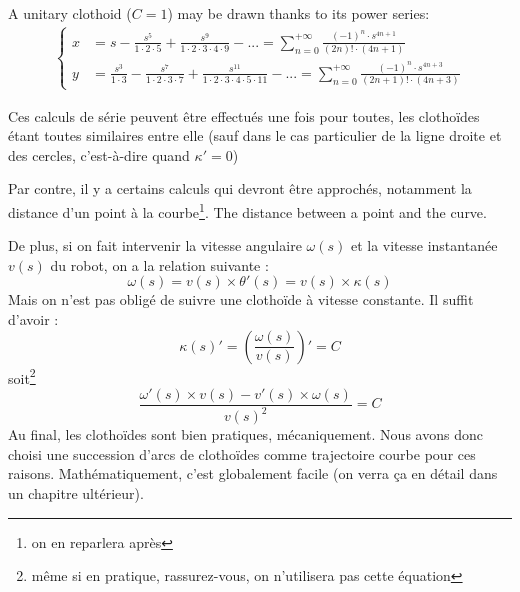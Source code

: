 \documentclass[11pt]{article}
\begin{document}
    A unitary clothoid ($C = 1$) may be drawn thanks to its power series:
    \begin{align*}
        \tag{**}
        \begin{cases}
            x &= s - \frac{s^5}{1 \cdot 2 \cdot 5} + \frac{s^9}{1 \cdot 2 \cdot 3 \cdot 4 \cdot 9} - ... = \sum_{n=0}^{+\infty} \frac{(-1)^n \cdot s^{4n+1}}{(2n)! \cdot (4n+1)} \\
            y &= \frac{s^3}{1 \cdot 3} - \frac{s^7}{1 \cdot 2 \cdot 3 \cdot 7} + \frac{s^{11}}{1 \cdot 2 \cdot 3 \cdot 4 \cdot 5 \cdot 11} - ... = \sum_{n=0}^{+\infty} \frac{(-1)^n \cdot s^{4n+3}}{(2n+1)! \cdot (4n+3)}
        \end{cases}
        \label{equ:clotho}
    \end{align*}

    Ces calculs de série peuvent être effectués une fois pour toutes, les clothoïdes étant toutes similaires entre elle (sauf dans le cas particulier de la ligne droite et des cercles, c'est-à-dire quand $\kappa' = 0$)

    Par contre, il y a certains calculs qui devront être approchés, notamment la distance d'un point à la courbe\footnote{on en reparlera après}.
    The distance between a point and the curve.

	
    De plus, si on fait intervenir la vitesse angulaire $\omega(s)$ et la vitesse instantanée $v(s)$ du robot, on a la relation suivante :
    \[\omega(s) = v(s) \times \theta'(s) = v(s) \times \kappa(s)\]
    Mais on n'est pas obligé de suivre une clothoïde à vitesse constante. Il suffit d'avoir :
    \[\kappa(s)' = \left(\frac{\omega(s)}{v(s)}\right)' = C\]
    soit\footnote{même si en pratique, rassurez-vous, on n'utilisera pas cette équation}
    \[\frac{\omega'(s) \times v(s) - v'(s) \times \omega(s)}{v(s)^2} = C\]
    Au final, les clothoïdes sont bien pratiques, mécaniquement. Nous avons donc choisi une succession d'arcs de clothoïdes comme trajectoire courbe pour ces raisons. Mathématiquement, c'est globalement facile (on verra ça en détail dans un chapitre ultérieur).
\end{document}
